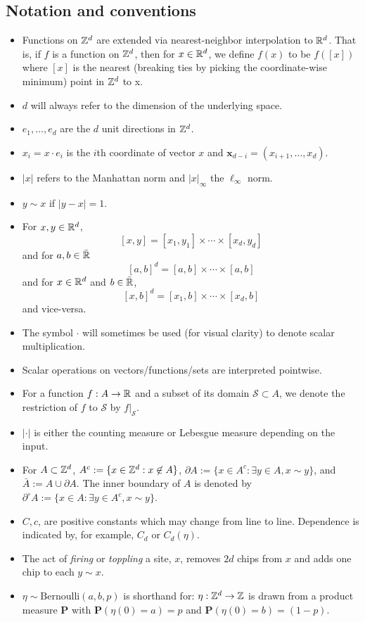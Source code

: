 \documentclass[12pt]{amsart}
\begin{document}
\subsection*{Notation and conventions} 
\begin{itemize}
	\item Functions on $\mathbb{Z}^d$ are extended via nearest-neighbor interpolation to $\mathbb{R}^d$.  
	That is, if $f$ is a function on $\mathbb{Z}^d$, then for $x \in \mathbb{R}^d$, we define $f(x)$ to be $f([x])$ where $[x]$ is the nearest (breaking ties by picking the coordinate-wise minimum) point in $\mathbb{Z}^d$ to x. 
	\item $d$ will always refer to the dimension of the underlying space.
	\item $e_1, \ldots, e_d$ are the $d$ unit directions in $\mathbb{Z}^d$.
	\item $x_i = x \cdot e_i$ is the $i$th coordinate of vector $x$ and $\mathbf{x}_{d-i} = (x_{i+1}, \ldots, x_d)$.
	\item $|x|$ refers to the Manhattan norm and $|x|_{\infty}$ the $\ell_\infty$ norm.
	\item $y \sim x$ if $|y-x| = 1$. 
	\item For $x,y \in \mathbb{R}^d$, 
	\[
	[x,y] = [x_1, y_1]  \times \cdots \times [x_d, y_d]
	\]
	and for $a,b \in \bar{\mathbb{R}}$
	\[
	[a,b]^d = [a,b] \times \cdots \times [a,b]
	\]
	and for $x \in \mathbb{R}^d$ and $b \in \bar{\mathbb{R}}$, 
	\[
	[x,b]^d = [x_1,b] \times \cdots \times [x_d, b]
	\]
	and vice-versa. 
	\item The symbol $\cdot$ will sometimes be used (for visual clarity) to denote scalar multiplication. 
	\item Scalar operations on vectors/functions/sets are interpreted pointwise.
	\item  For a function  $f:A \to \mathbb{R}$ and a subset of its domain $\mathcal{S} \subset A$, we denote the restriction of $f$ to $\mathcal{S}$ by  $f|_{\mathcal{S}}$. 
	\item $|\cdot|$ is either the counting measure or Lebesgue measure depending on the input.
	\item For $A \subset \mathbb{Z}^d$, $A^c := \{ x \in \mathbb{Z}^d : x \not \in A\}$, $\partial A := \{x \in A^c : \exists y \in A, x \sim y\}$,
	and $\bar{A} := A \cup \partial A$. The inner boundary of $A$ is denoted by $\partial^{\circ} A  := \{ x \in A : 
	\exists y \in A^c, x \sim y\}$. 
	\item $C,c$, are positive constants which may change from line to line. Dependence is indicated by, for example, $C_d$ or $C_d(\eta)$.
	\item  The act of {\it firing} or {\it toppling} a site, $x$, removes $2 d$ chips from $x$ and adds one chip to each $y \sim x$.
	\item  $\eta \sim \mbox{Bernoulli}(a, b, p)$ is shorthand for: $\eta: \mathbb{Z}^d \to \mathbb{Z}$ is drawn from a product measure 
	$\mathbf{P}$ with $\mathbf{P}(\eta(0) =  a) = p$ and $\mathbf{P}(\eta(0) = b) = (1-p)$.
\end{itemize}
\end{document}
